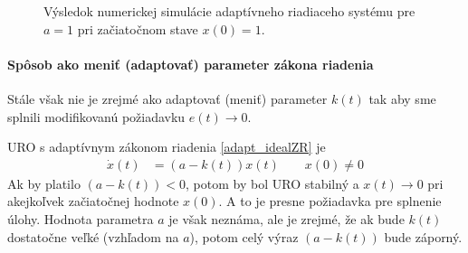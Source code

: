 \documentclass[a4paper, 10pt, ]{article}
\begin{document}
\begin{figure}[t]
	\centering
	\caption{Výsledok numerickej simulácie adaptívneho riadiaceho systému pre $a = 1$ pri začiatočnom stave $x(0) = 1$.}
	\label{Výsledok numerickej simulácie adapt systému}
\end{figure}





\paragraph{Spôsob ako meniť (adaptovať) parameter zákona riadenia}

Stále však nie je zrejmé ako adaptovať (meniť) parameter $k(t)$ tak aby sme splnili modifikovanú požiadavku $e(t) \to 0$.

URO s adaptívnym zákonom riadenia \eqref{adapt_idealZR} je
\begin{align}
	\dot x(t) &= \left( a - k(t) \right) x(t) \qquad x(0) \neq 0
\end{align}
Ak by platilo $\left( a - k(t) \right) < 0$, potom by bol URO stabilný a $x(t) \to 0$ pri akejkoľvek začiatočnej hodnote $x(0)$. A to je presne požiadavka pre splnenie úlohy. Hodnota parametra $a$ je však neznáma, ale je zrejmé, že ak bude $k(t)$ dostatočne veľké (vzhľadom na $a$), potom celý výraz $\left( a - k(t) \right)$ bude záporný.
\end{document}
